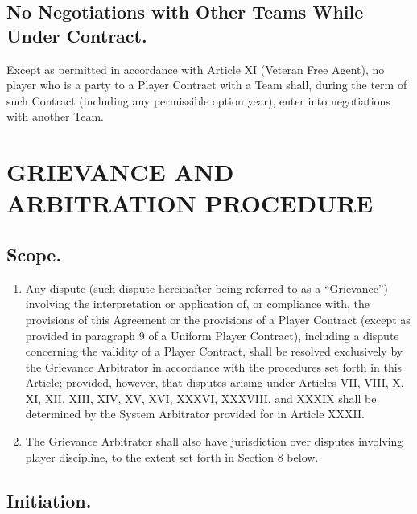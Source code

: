 \documentclass[
]{book}
\providecommand{\tightlist}{%
  \setlength{\itemsep}{0pt}\setlength{\parskip}{0pt}}
\begin{document}
\hypertarget{no-negotiations-with-other-teams-while-under-contract.}{%
\section{No Negotiations with Other Teams While Under Contract.}\label{no-negotiations-with-other-teams-while-under-contract.}}

Except as permitted in accordance with Article XI (Veteran Free Agent), no player who is a party to a Player Contract with a Team shall, during the term of such Contract (including any permissible option year), enter into negotiations with another Team.

\hypertarget{grievance-and-arbitration-procedure}{%
\chapter{GRIEVANCE AND ARBITRATION PROCEDURE}\label{grievance-and-arbitration-procedure}}

\hypertarget{scope.}{%
\section{Scope.}\label{scope.}}

\begin{enumerate}
\def\labelenumi{(\alph{enumi})}
\tightlist
\item
  Any dispute (such dispute hereinafter being referred to as a ``Grievance'') involving the interpretation or application of, or compliance with, the provisions of this Agreement or the provisions of a Player Contract (except as provided in paragraph 9 of a Uniform Player Contract), including a dispute concerning the validity of a Player Contract, shall be resolved exclusively by the Grievance Arbitrator in accordance with the procedures set forth in this Article; provided, however, that disputes arising under Articles VII, VIII, X, XI, XII, XIII, XIV, XV, XVI, XXXVI, XXXVIII, and XXXIX shall be determined by the System Arbitrator provided for in Article XXXII.
\item
  The Grievance Arbitrator shall also have jurisdiction over disputes involving player discipline, to the extent set forth in Section 8 below.
\end{enumerate}

\hypertarget{initiation.}{%
\section{Initiation.}\label{initiation.}}
\end{document}
